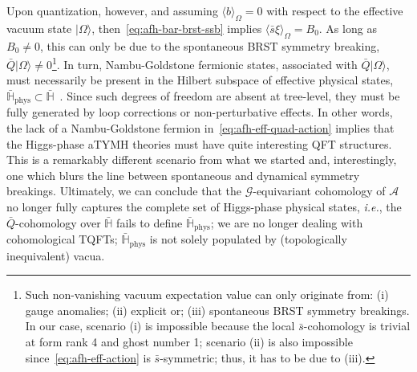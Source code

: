 \documentclass[../main.tex]{subfiles}
\begin{document}
Upon quantization, however, and assuming $ \langle b\rangle_{\Omega} = 0$ with respect to the effective vacuum state $\lvert \Omega \rangle$, then~\eqref{eq:afh-bar-brst-ssb} implies $\langle \bar{s} \xi \rangle_{\Omega} = B_0$. As long as $B_0 \neq 0$, this can only be due to the spontaneous BRST symmetry breaking, $\bar{Q} \lvert \Omega \rangle \neq 0$\footnote{Such non-vanishing vacuum expectation value can only originate from: (i) gauge anomalies; (ii) explicit or; (iii) spontaneous BRST symmetry breakings. In our case, scenario (i) is impossible because the local $\bar{s}$-cohomology is trivial at form rank 4 and ghost number 1; scenario (ii) is also impossible since~\eqref{eq:afh-eff-action} is $\bar{s}$-symmetric; thus, it has to be due to (iii).}. In turn, Nambu-Goldstone fermionic states, associated with $\bar{Q}\lvert \Omega \rangle$, must necessarily be present in the Hilbert subspace of effective physical states, $\bar{\mathbb{H}}_{\text{phys}} \subset \bar{\mathbb{H}}$~\cite{fujikawa1983a,witten1982a,witten1981a,salam1974a,fayet1974a}. Since such degrees of freedom are absent at tree-level, they must be fully generated by loop corrections or non-perturbative effects. In other words, the lack of a Nambu-Goldstone fermion in~\eqref{eq:afh-eff-quad-action} implies that the Higgs-phase aTYMH theories must have quite interesting QFT structures. This is a remarkably different scenario from what we started and, interestingly, one which blurs the line between spontaneous and dynamical symmetry breakings. Ultimately, we can conclude that the $\mathcal{G}$-equivariant cohomology of $\mathcal{A}$ no longer fully captures the complete set of Higgs-phase physical states, \textit{i.e.}, the $\bar{Q}$-cohomology over $\bar{\mathbb{H}}$ fails to define $\bar{\mathbb{H}}_{\text{phys}}$; we are no longer dealing with cohomological TQFTs; $\bar{\mathbb{H}}_{\text{phys}}$ is not solely populated by (topologically inequivalent) vacua.
\end{document}
